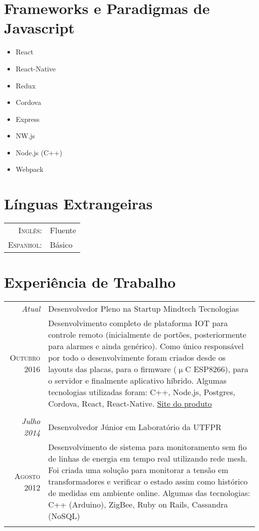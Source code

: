 \section{Frameworks e Paradigmas de Javascript}
\begin{multicols}{4}
	\begin{itemize}
		\item React
		\item React-Native
		\item Redux
		\item Cordova
		\item Express
		\item NW.js
		\item Node.js (C++)
		\item Webpack
	\end{itemize}
\end{multicols}

\section{Línguas Extrangeiras}
\begin{tabular}{rl}
	\textsc{Inglês:}&Fluente\\
	\textsc{Espanhol:}&Básico\\
\end{tabular}

\section{Experiência de Trabalho}
\begin{tabular}{r|p{11cm}}
	\emph{Atual} & Desenvolvedor Pleno na Startup Mindtech Tecnologias \\
	\textsc{Outubro 2016} &	\footnotesize{Desenvolvimento completo de plataforma IOT
	para controle	remoto (inicialmente de portões, posteriormente para alarmes e ainda
	genérico). Como único responsável por todo o desenvolvimente foram criados desde os
	layouts	das placas, para o firmware ($\upmu$C ESP8266), para o servidor e finalmente
	aplicativo híbrido. Algumas tecnologias utilizadas foram: C++, Node.js, Postgres,
	Cordova, React, React-Native. \href{http://mindtech.com.br/}{Site do produto}}\\
	\multicolumn{2}{c}{} \\

	\emph{Julho 2014} & Desenvolvedor Júnior em Laboratório da UTFPR\\
	\textsc{Agosto 2012} & \footnotesize{Desenvolvimento de sistema para monitoramento
	sem fio de linhas de energia em tempo real utilizando rede mesh. Foi criada uma
	solução para monitorar a tensão em transformadores e verificar o estado assim
	como histórico de medidas em ambiente online. Algumas das tecnologias: C++ (Arduino),
	ZigBee,	Ruby on Rails, Cassandra (NoSQL)}\\
	\multicolumn{2}{c}{} \\
\end{tabular}

